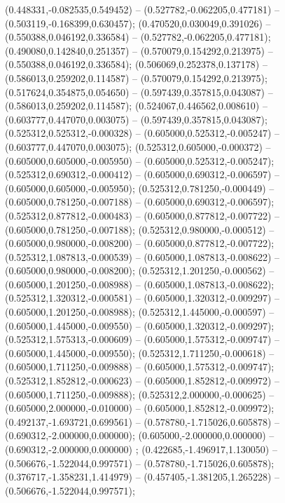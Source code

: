  (0.448331,-0.082535,0.549452) -- (0.527782,-0.062205,0.477181) -- (0.503119,-0.168399,0.630457);
 (0.470520,0.030049,0.391026) -- (0.550388,0.046192,0.336584) -- (0.527782,-0.062205,0.477181);
 (0.490080,0.142840,0.251357) -- (0.570079,0.154292,0.213975) -- (0.550388,0.046192,0.336584);
 (0.506069,0.252378,0.137178) -- (0.586013,0.259202,0.114587) -- (0.570079,0.154292,0.213975);
 (0.517624,0.354875,0.054650) -- (0.597439,0.357815,0.043087) -- (0.586013,0.259202,0.114587);
 (0.524067,0.446562,0.008610) -- (0.603777,0.447070,0.003075) -- (0.597439,0.357815,0.043087);
 (0.525312,0.525312,-0.000328) -- (0.605000,0.525312,-0.005247) -- (0.603777,0.447070,0.003075);
 (0.525312,0.605000,-0.000372) -- (0.605000,0.605000,-0.005950) -- (0.605000,0.525312,-0.005247);
 (0.525312,0.690312,-0.000412) -- (0.605000,0.690312,-0.006597) -- (0.605000,0.605000,-0.005950);
 (0.525312,0.781250,-0.000449) -- (0.605000,0.781250,-0.007188) -- (0.605000,0.690312,-0.006597);
 (0.525312,0.877812,-0.000483) -- (0.605000,0.877812,-0.007722) -- (0.605000,0.781250,-0.007188);
 (0.525312,0.980000,-0.000512) -- (0.605000,0.980000,-0.008200) -- (0.605000,0.877812,-0.007722);
 (0.525312,1.087813,-0.000539) -- (0.605000,1.087813,-0.008622) -- (0.605000,0.980000,-0.008200);
 (0.525312,1.201250,-0.000562) -- (0.605000,1.201250,-0.008988) -- (0.605000,1.087813,-0.008622);
 (0.525312,1.320312,-0.000581) -- (0.605000,1.320312,-0.009297) -- (0.605000,1.201250,-0.008988);
 (0.525312,1.445000,-0.000597) -- (0.605000,1.445000,-0.009550) -- (0.605000,1.320312,-0.009297);
 (0.525312,1.575313,-0.000609) -- (0.605000,1.575312,-0.009747) -- (0.605000,1.445000,-0.009550);
 (0.525312,1.711250,-0.000618) -- (0.605000,1.711250,-0.009888) -- (0.605000,1.575312,-0.009747);
 (0.525312,1.852812,-0.000623) -- (0.605000,1.852812,-0.009972) -- (0.605000,1.711250,-0.009888);
 (0.525312,2.000000,-0.000625) -- (0.605000,2.000000,-0.010000) -- (0.605000,1.852812,-0.009972);
 (0.492137,-1.693721,0.699561) -- (0.578780,-1.715026,0.605878) -- (0.690312,-2.000000,0.000000);
 (0.605000,-2.000000,0.000000) -- (0.690312,-2.000000,0.000000) ;
 (0.422685,-1.496917,1.130050) -- (0.506676,-1.522044,0.997571) -- (0.578780,-1.715026,0.605878);
 (0.376717,-1.358231,1.414979) -- (0.457405,-1.381205,1.265228) -- (0.506676,-1.522044,0.997571);
